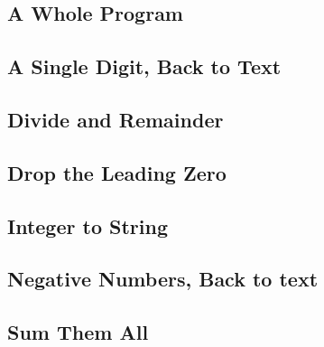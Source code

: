 \subsection{A Whole Program}\label{subsec:11-06a_whole_program}
\subsection{A Single Digit, Back to Text}\label{subsec:11-07a_single_digit_back_to_text}
\subsection{Divide and Remainder}\label{subsec:11-08divide_and_remainder}
\subsection{Drop the Leading Zero}\label{subsec:11-09drop_the_leading_zero}
\subsection{Integer to String}\label{subsec:11-10integer_to_string}
\subsection{Negative Numbers, Back to text}\label{subsec:11-11negative_numbers_back_to_text}
\subsection{Sum Them All}\label{subsec:11-12sum_them_all}
